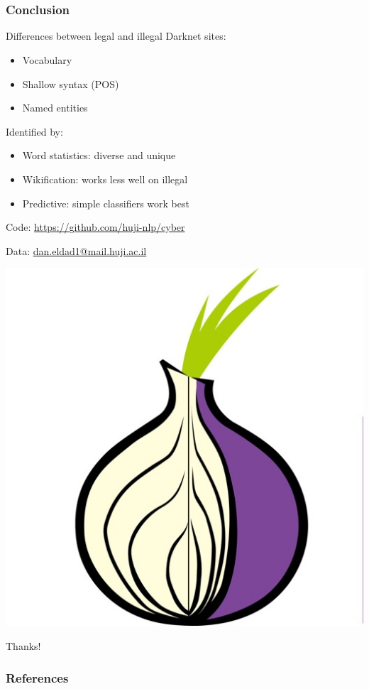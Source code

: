 \documentclass[t,xcolor={svgnames,table}]{beamer}
\begin{document}
\section*{}

\begin{frame}
	\frametitle{Conclusion}
	Differences between legal and illegal Darknet sites:	
	\begin{itemize}\setlength\itemsep{1em}
	\item Vocabulary
	\item Shallow syntax (POS)
	\item Named entities
	\end{itemize}
	\vfill
	\pause
	
	Identified by:
	\begin{itemize}\setlength\itemsep{1em}
	\item Word statistics: diverse and unique
	\item Wikification: works less well on illegal
	\item Predictive: simple classifiers work best
	\end{itemize}
	\vfill
	\pause
	
	\begin{minipage}{.7\textwidth}
	Code: {\color{blue}\url{https://github.com/huji-nlp/cyber}}
	
	Data: {\color{blue}\url{dan.eldad1@mail.huji.ac.il}}
	\end{minipage}
	\pause
	\begin{minipage}{.28\textwidth}
	\centering\vspace{-2cm}
	\includegraphics[width=.8\textwidth]{onion.jpg}
	
	Thanks!
	\end{minipage}
\end{frame}

\begin{frame}[allowframebreaks]
\frametitle{References}

\tiny
\end{frame}
\end{document}
